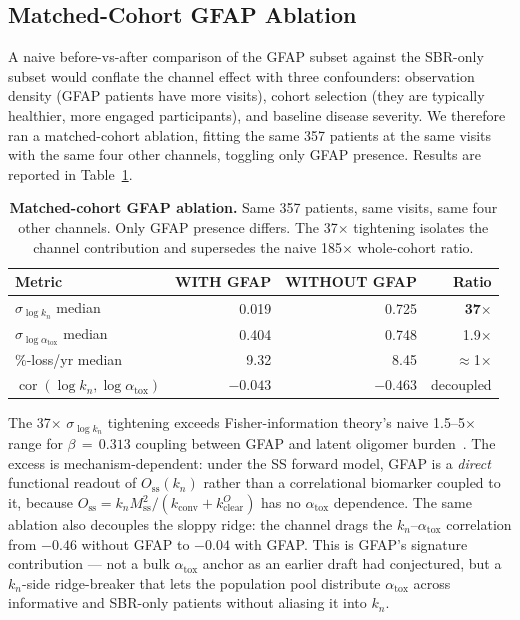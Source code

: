 \subsection{Matched-Cohort GFAP Ablation}
\label{subsec:ch9-6-ablation}

A naive before-vs-after comparison of the GFAP subset against the SBR-only subset would conflate the channel effect with three confounders: observation density (GFAP patients have more visits), cohort selection (they are typically healthier, more engaged participants), and baseline disease severity. We therefore ran a matched-cohort ablation, fitting the same 357 patients at the same visits with the same four other channels, toggling only GFAP presence. Results are reported in Table~\ref{tab:ch9-6-ablation}.

\begin{table}[t!]
\centering
\caption[Matched-cohort GFAP ablation]{\textbf{Matched-cohort GFAP ablation.} Same 357 patients, same visits, same four other channels. Only GFAP presence differs. The 37$\times$ tightening isolates the channel contribution and supersedes the naive 185$\times$ whole-cohort ratio.}
\label{tab:ch9-6-ablation}
\small
\begin{tabular}{lrrr}
\toprule
\textbf{Metric} & \textbf{WITH GFAP} & \textbf{WITHOUT GFAP} & \textbf{Ratio} \\
\midrule
$\sigma_{\log k_n}$ median            & 0.019 & 0.725 & \textbf{37$\times$} \\
$\sigma_{\log \alpha_\text{tox}}$ median & 0.404 & 0.748 & 1.9$\times$ \\
$\%$-loss/yr median                   & 9.32 & 8.45 & $\approx$1$\times$ \\
$\operatorname{cor}(\log k_n, \log \alpha_\text{tox})$ & $-0.043$ & $-0.463$ & decoupled \\
\bottomrule
\end{tabular}
\end{table}

The 37$\times$ $\sigma_{\log k_n}$ tightening exceeds Fisher-information theory's naive 1.5--5$\times$ range for $\beta\,{=}\,0.313$ coupling between GFAP and latent oligomer burden~\cite{liu2023gfap}. The excess is mechanism-dependent: under the SS forward model, GFAP is a \emph{direct} functional readout of $O_\text{ss}(k_n)$ rather than a correlational biomarker coupled to it, because $O_\text{ss} = k_n M_\text{ss}^2 / (k_\text{conv} + k_\text{clear}^O)$ has no $\alpha_\text{tox}$ dependence. The same ablation also decouples the sloppy ridge: the channel drags the $k_n$--$\alpha_\text{tox}$ correlation from $-0.46$ without GFAP to $-0.04$ with GFAP. This is GFAP's signature contribution --- not a bulk $\alpha_\text{tox}$ anchor as an earlier draft had conjectured, but a $k_n$-side ridge-breaker that lets the population pool distribute $\alpha_\text{tox}$ across informative and SBR-only patients without aliasing it into $k_n$.

